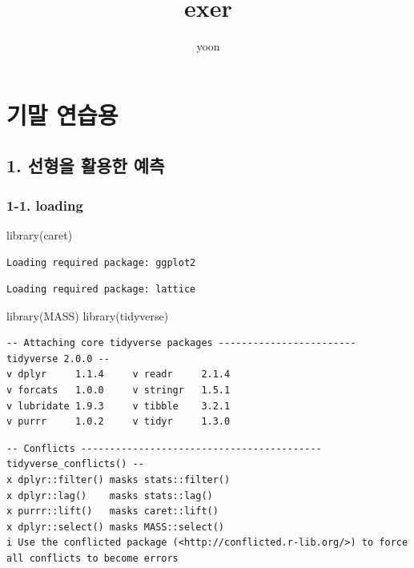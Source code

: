 \documentclass[
  letterpaper,
  DIV=11,
  numbers=noendperiod]{scrartcl}
\title{exer}
\author{yoon}
\date{}
\newenvironment{Shaded}{\begin{snugshade}}{\end{snugshade}}
\newcommand{\FunctionTok}[1]{\textcolor[rgb]{0.28,0.35,0.67}{#1}}
\newcommand{\NormalTok}[1]{\textcolor[rgb]{0.00,0.23,0.31}{#1}}
\begin{document}
\maketitle


\section{기말 연습용}\label{uxae30uxb9d0-uxc5f0uxc2b5uxc6a9}

\subsection{1. 선형을 활용한
예측}\label{uxc120uxd615uxc744-uxd65cuxc6a9uxd55c-uxc608uxce21}

\subsubsection{1-1. loading}\label{loading}

\begin{Shaded}
\begin{Highlighting}[]
\FunctionTok{library}\NormalTok{(caret)}
\end{Highlighting}
\end{Shaded}

\begin{verbatim}
Loading required package: ggplot2
\end{verbatim}

\begin{verbatim}
Loading required package: lattice
\end{verbatim}

\begin{Shaded}
\begin{Highlighting}[]
\FunctionTok{library}\NormalTok{(MASS)}
\FunctionTok{library}\NormalTok{(tidyverse)}
\end{Highlighting}
\end{Shaded}

\begin{verbatim}
-- Attaching core tidyverse packages ------------------------ tidyverse 2.0.0 --
v dplyr     1.1.4     v readr     2.1.4
v forcats   1.0.0     v stringr   1.5.1
v lubridate 1.9.3     v tibble    3.2.1
v purrr     1.0.2     v tidyr     1.3.0
\end{verbatim}

\begin{verbatim}
-- Conflicts ------------------------------------------ tidyverse_conflicts() --
x dplyr::filter() masks stats::filter()
x dplyr::lag()    masks stats::lag()
x purrr::lift()   masks caret::lift()
x dplyr::select() masks MASS::select()
i Use the conflicted package (<http://conflicted.r-lib.org/>) to force all conflicts to become errors
\end{verbatim}
\end{document}
